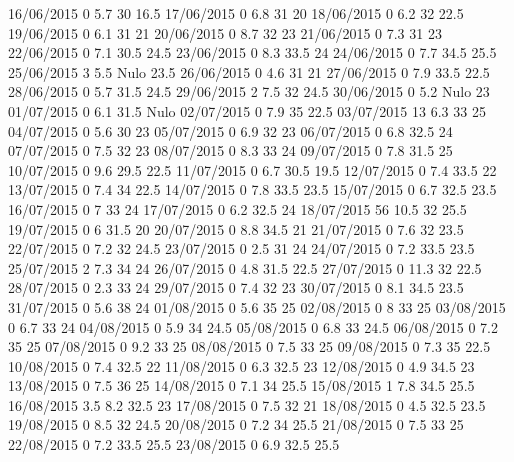 16/06/2015  0      5.7    30     16.5 
17/06/2015  0      6.8    31     20 
18/06/2015  0      6.2    32     22.5 
19/06/2015  0      6.1    31     21 
20/06/2015  0      8.7    32     23 
21/06/2015  0      7.3    31     23 
22/06/2015  0      7.1    30.5   24.5 
23/06/2015  0      8.3    33.5   24 
24/06/2015  0      7.7    34.5   25.5 
25/06/2015  3      5.5   Nulo    23.5 
26/06/2015  0      4.6    31     21 
27/06/2015  0      7.9    33.5   22.5 
28/06/2015  0      5.7    31.5   24.5 
29/06/2015  2      7.5    32     24.5 
30/06/2015  0      5.2   Nulo    23 
01/07/2015  0      6.1    31.5  Nulo
02/07/2015  0      7.9    35     22.5 
03/07/2015  13     6.3    33     25 
04/07/2015  0      5.6    30     23 
05/07/2015  0      6.9    32     23 
06/07/2015  0      6.8    32.5   24 
07/07/2015  0      7.5    32     23 
08/07/2015  0      8.3    33     24 
09/07/2015  0      7.8    31.5   25 
10/07/2015  0      9.6    29.5   22.5 
11/07/2015  0      6.7    30.5   19.5 
12/07/2015  0      7.4    33.5   22 
13/07/2015  0      7.4    34     22.5 
14/07/2015  0      7.8    33.5   23.5 
15/07/2015  0      6.7    32.5   23.5 
16/07/2015  0      7      33     24 
17/07/2015  0      6.2    32.5   24 
18/07/2015  56     10.5   32     25.5 
19/07/2015  0      6      31.5   20 
20/07/2015  0      8.8    34.5   21 
21/07/2015  0      7.6    32     23.5 
22/07/2015  0      7.2    32     24.5 
23/07/2015  0      2.5    31     24 
24/07/2015  0      7.2    33.5   23.5 
25/07/2015  2      7.3    34     24 
26/07/2015  0      4.8    31.5   22.5 
27/07/2015  0      11.3   32     22.5 
28/07/2015  0      2.3    33     24 
29/07/2015  0      7.4    32     23 
30/07/2015  0      8.1    34.5   23.5 
31/07/2015  0      5.6    38     24 
01/08/2015  0      5.6    35     25 
02/08/2015  0      8      33     25 
03/08/2015  0      6.7    33     24 
04/08/2015  0      5.9    34     24.5 
05/08/2015  0      6.8    33     24.5 
06/08/2015  0      7.2    35     25 
07/08/2015  0      9.2    33     25 
08/08/2015  0      7.5    33     25 
09/08/2015  0      7.3    35     22.5 
10/08/2015  0      7.4    32.5   22 
11/08/2015  0      6.3    32.5   23 
12/08/2015  0      4.9    34.5   23 
13/08/2015  0      7.5    36     25 
14/08/2015  0      7.1    34     25.5 
15/08/2015  1      7.8    34.5   25.5 
16/08/2015  3.5    8.2    32.5   23 
17/08/2015  0      7.5    32     21 
18/08/2015  0      4.5    32.5   23.5 
19/08/2015  0      8.5    32     24.5 
20/08/2015  0      7.2    34     25.5 
21/08/2015  0      7.5    33     25 
22/08/2015  0      7.2    33.5   25.5 
23/08/2015  0      6.9    32.5   25.5 

